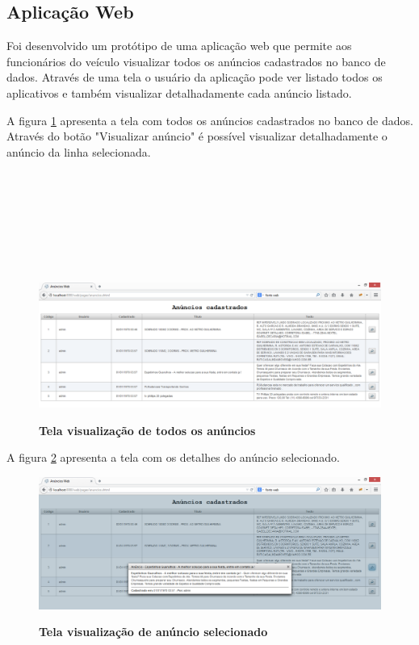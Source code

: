 \documentclass[
	12pt,				%
	openright,			%
	oneside,			%
	a4paper,			%
	chapter=TITLE,		%
	section=TITLE,		%
	english,			%
	french,				%
	spanish,			%
	brazil				%
	]{abntex2}
\begin{document}
\subsection{Aplicação Web}

Foi desenvolvido um protótipo de uma aplicação web que permite aos funcionários do veículo visualizar todos os anúncios cadastrados no banco de dados. Através de uma tela o usuário da aplicação pode ver listado todos os aplicativos e também visualizar detalhadamente cada anúncio listado.

A figura \ref{fig-anuncios-web} apresenta a tela com todos os anúncios cadastrados no banco de dados. Através do botão "Visualizar anúncio" é possível visualizar detalhadamente o anúncio da linha selecionada. \\ \\ \\ \\ \\ \\ \\ \\

\begin{figure}[h]
	\begin{center}
		\caption{
			\textbf{Tela visualização de todos os anúncios}
		}\label{fig-anuncios-web}
		\includegraphics [scale=0.4]{imagens/anuncios-web.png}
		\label{fig-anuncios-web}
	\end{center}
\end{figure}

A figura \ref{fig-anuncio-web} apresenta a tela com os detalhes do anúncio selecionado.

\begin{figure}[h]
	\begin{center}
		\caption{
			\textbf{Tela visualização de anúncio selecionado}
		}\label{fig-anuncio-web}
		\includegraphics [scale=0.4]{imagens/anuncio-web.png}
		\label{fig-anuncio-web}
	\end{center}
\end{figure}
\end{document}
